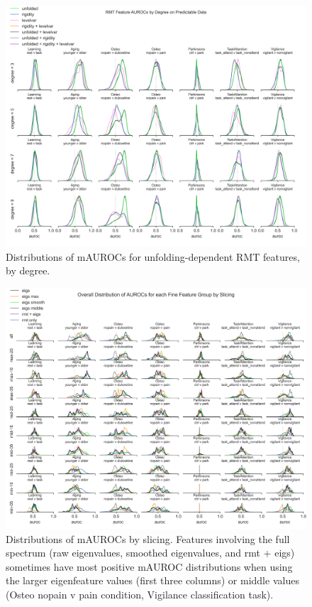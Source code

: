 \documentclass{article}  %
\begin{document}
\begin{figure}[H]
\begin{center}
\includegraphics[width=\textwidth,height=0.9\textheight,keepaspectratio]{rmt_feature_auroc_by_degree.png}
\end{center}
\caption
{ \label{fig:fine-degree}
Distributions of mAUROCs for unfolding-dependent RMT features, by degree.}
\end{figure}


\begin{figure}[H]
\begin{center}
\includegraphics[width=\textwidth,height=0.9\textheight,keepaspectratio]{rmt_eigs_aurocs_by_subgroup_and_slicing.png}
\end{center}
\caption
{ \label{fig:best-params-slicing} Distributions of mAUROCs by slicing. Features
involving the full spectrum (raw eigenvalues, smoothed eigenvalues, and rmt +
eigs) sometimes have most positive mAUROC distributions when using the larger
eigenfeature values (first three columns) or middle values (Osteo nopain v pain
condition, Vigilance classification task).}
\end{figure}
\end{document}
